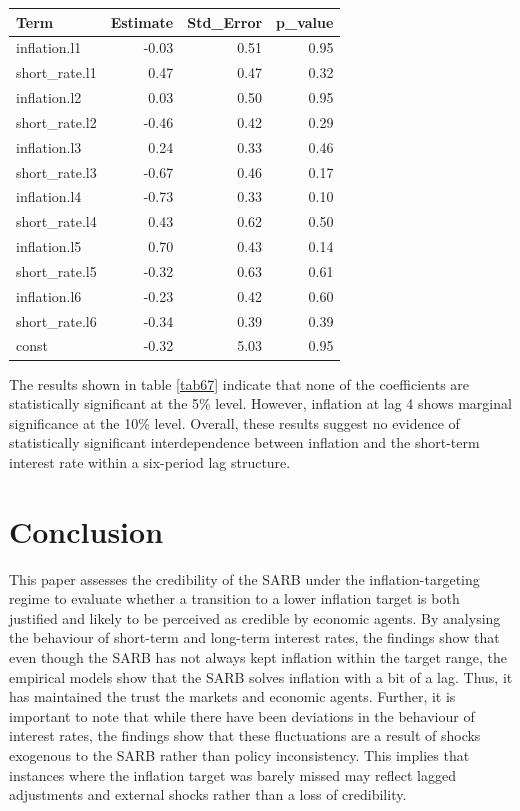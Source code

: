 \documentclass[11pt,preprint]{elsarticle}
\let\origtable\table
\let\endorigtable\endtable
\renewenvironment{table}[1][2] {
    \expandafter\origtable\expandafter[H]
} {
    \endorigtable
}
\numberwithin{equation}{section}
\numberwithin{figure}{section}
\numberwithin{table}{section}
\begin{document}
\begin{table}[H]
\centering
\begin{tabular}{lrrr}
  \hline
Term & Estimate & Std\_Error & p\_value \\ 
  \hline
inflation.l1 & -0.03 & 0.51 & 0.95 \\ 
  short\_rate.l1 & 0.47 & 0.47 & 0.32 \\ 
  inflation.l2 & 0.03 & 0.50 & 0.95 \\ 
  short\_rate.l2 & -0.46 & 0.42 & 0.29 \\ 
  inflation.l3 & 0.24 & 0.33 & 0.46 \\ 
  short\_rate.l3 & -0.67 & 0.46 & 0.17 \\ 
  inflation.l4 & -0.73 & 0.33 & 0.10 \\ 
  short\_rate.l4 & 0.43 & 0.62 & 0.50 \\ 
  inflation.l5 & 0.70 & 0.43 & 0.14 \\ 
  short\_rate.l5 & -0.32 & 0.63 & 0.61 \\ 
  inflation.l6 & -0.23 & 0.42 & 0.60 \\ 
  short\_rate.l6 & -0.34 & 0.39 & 0.39 \\ 
  const & -0.32 & 5.03 & 0.95 \\ 
   \hline
\end{tabular}
\caption{VAR(6) Model Coefficient for the Short-Term Interest Rate \label{tab67}} 
\end{table}

The results shown in table \ref{tab67} indicate that none of the
coefficients are statistically significant at the 5\% level. However,
inflation at lag 4 shows marginal significance at the 10\% level.
Overall, these results suggest no evidence of statistically significant
interdependence between inflation and the short-term interest rate
within a six-period lag structure.

\section{Conclusion}\label{conclusion}

This paper assesses the credibility of the SARB under the
inflation-targeting regime to evaluate whether a transition to a lower
inflation target is both justified and likely to be perceived as
credible by economic agents. By analysing the behaviour of short-term
and long-term interest rates, the findings show that even though the
SARB has not always kept inflation within the target range, the
empirical models show that the SARB solves inflation with a bit of a
lag. Thus, it has maintained the trust the markets and economic agents.
Further, it is important to note that while there have been deviations
in the behaviour of interest rates, the findings show that these
fluctuations are a result of shocks exogenous to the SARB rather than
policy inconsistency. This implies that instances where the inflation
target was barely missed may reflect lagged adjustments and external
shocks rather than a loss of credibility.
\end{document}
